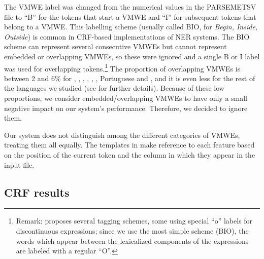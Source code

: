 \documentclass[output=paper
,modfonts
,nonflat]{langsci/langscibook}
\begin{document}
The VMWE label was changed from the
numerical values in the PARSEMETSV file to ``B'' for the tokens that
start a VMWE and ``I'' for subsequent tokens that belong to a
VMWE. This labelling scheme (usually called BIO, for {\em Begin,
Inside, Outside}) is common in CRF-based implementations of
NER systems. The BIO scheme can represent several
consecutive VMWEs but cannot represent embedded or overlapping VMWEs, so
these were ignored and a single B or I label was used for overlapping
tokens.\footnote{Remark: \cite{Schneider14b} proposes several tagging schemes, some using special ``o'' labels for discontinuous expressions; since we use the most simple scheme (BIO), the words which appear between the lexicalized components of the expressions are labeled with a regular ``O''.} %
The proportion of overlapping VMWEs is between 2 and 6\% for , , , , , , Portuguese and ,
and it is even less for the rest of the languages we studied (see  for further details).
Because of these low proportions, we consider embedded/overlapping VMWEs to have only a small negative impact on our system's performance. Therefore, we decided to ignore them.

Our system does not distinguish among the different categories of VMWEs, treating them all equally. The templates in
 make reference to each feature based on
the position of the current token and the column in which they appear
in the input file.

\subsection{CRF results}

\end{document}
